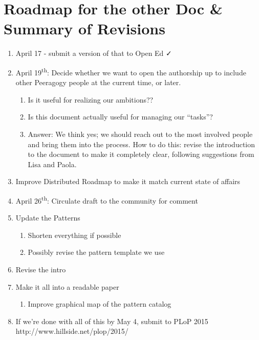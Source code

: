 \section{Roadmap for the other Doc \& Summary of Revisions}

\begin{enumerate}
\item April 17 - submit a version of that to Open Ed ✓
\item April 19\textsuperscript{th}: Decide whether we want to open the authorship up to include other Peeragogy people at the current time, or later. 
\begin{enumerate}
\item Is it useful for realizing our ambitions??
\item Is this document actually useful for managing our ``tasks''?
\item Answer: We think yes; we should reach out to the most involved people and bring them into the process.  How to do this: revise the introduction to the document to make it completely clear, following suggestions from Lisa and Paola.
\end{enumerate}
\item Improve Distributed Roadmap to make it match current state of affairs 
\item April 26\textsuperscript{th}: Circulate draft to the community for comment
\item Update the Patterns
\begin{enumerate}
\item Shorten everything if possible
\item Possibly revise the pattern template we use
\end{enumerate}
\item Revise the intro
\item Make it all into a readable paper
\begin{enumerate}
\item Improve graphical map of the pattern catalog
\end{enumerate}
\item If we're done with all of this by May 4, submit to PLoP 2015 http://www.hillside.net/plop/2015/
\end{enumerate}